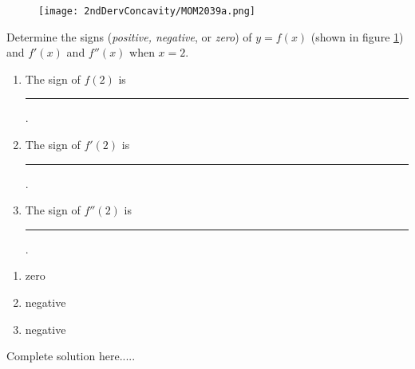 \begin{figure}
\texttt{[image: 2ndDervConcavity/MOM2039a.png]}
\caption{ }
\label{fig:MOM2039a}
\end{figure}
\hfill \break
\begin{example}
Determine the signs (\emph{positive, negative}, or \emph{zero}) of $y=f(x)$ (shown in figure \ref{fig:MOM2039a}) and $f'(x)$ and $f''(x)$ when $x=2$.

\renewcommand{\labelenumi}{(\alph{enumi})}
    \begin{enumerate}
        \item The sign of $f(2)$ is \rule{1cm}{0.25mm}.
        \item The sign of $f'(2)$ is \rule{1cm}{0.25mm}.
        \item The sign of $f''(2)$ is \rule{1cm}{0.25mm}.
    \end{enumerate}
    \begin{sol}
    \renewcommand{\labelenumi}{(\alph{enumi})}
    \begin{enumerate}
        \item zero
        \item negative
        \item negative
    \end{enumerate}
    \end{sol}
    \begin{solL}
    Complete solution here.....
    
    \end{solL}
    
\end{example}
\vspace{0.6in}

